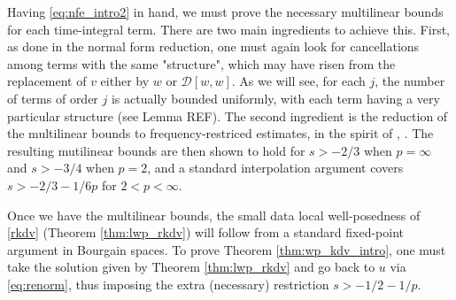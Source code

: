 \documentclass[%
11pt,  reqno]{amsart}
\newcommand{\5}{\textup{V}}
\theoremstyle{remark}
\numberwithin{equation}{section}
\numberwithin{theorem}{section}
\begin{document}
	\medskip
	
	
	Having \eqref{eq:nfe_intro2} in hand, we must prove the necessary multilinear bounds for each time-integral term. There are two main ingredients to achieve this. First, as done in the normal form reduction, one must again look for cancellations among terms with the same "structure", which may have risen from the replacement of $v$ either by $w$ or $\mathcal{D}[w,w]$. As we will see, for each $j$, the number of terms of order $j$ is actually bounded uniformly, with each term having a very particular structure (see Lemma REF). The second ingredient is the reduction of the multilinear bounds to frequency-restriced estimates, in the spirit of \cite{COS}, \cite{CC24} \cite{CLS}. The resulting mutilinear bounds are then shown to hold for $s>-2/3$ when $p=\infty$ and $s>-3/4$ when $p=2$, and a standard interpolation argument covers $s>-2/3-1/6p$ for $2<p<\infty$.
	
	\medskip
	
	
	Once we have the multilinear bounds, the small data local well-posedness of \eqref{rkdv} (Theorem \ref{thm:lwp_rkdv}) will follow from a standard fixed-point argument in Bourgain spaces. To prove Theorem \ref{thm:wp_kdv_intro}, one must take the solution given by Theorem \ref{thm:lwp_rkdv} and go back to $u$ via \eqref{eq:renorm}, thus imposing the extra (necessary) restriction $s>-1/2-1/p$.
	
\end{document}
